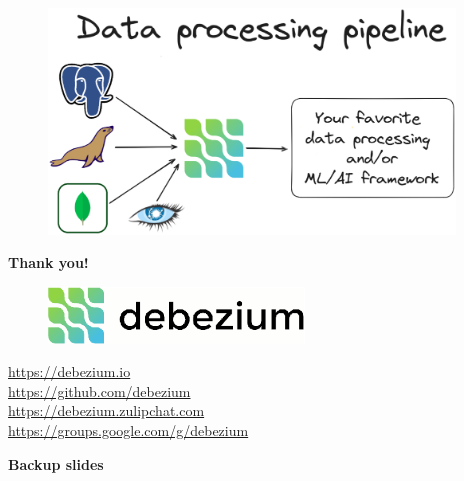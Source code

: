 \documentclass[10pt,utf8]{beamer}
\begin{document}
\begin{frame}
    \begin{figure}
        \centering
        \includegraphics[height=6cm]{./img/dbs_to_ml.eps}
    \end{figure}
\end{frame}

\begin{frame}
    \centering
    \textbf{\Huge{Thank you!}}
    
    \vspace{1cm}
    
    \begin{figure}
        \centering
        \includegraphics[height=1.5cm]{./img/debezium.eps}
    \end{figure}
    
    \vspace{0.5cm}
    
    \centering
    \color{blue}
    \url{https://debezium.io}\\
    \url{https://github.com/debezium}\\
    \url{https://debezium.zulipchat.com}\\
    \url{https://groups.google.com/g/debezium}\\
    \color{black}
\end{frame}



\begin{frame}
    \centering
    \huge{\textbf{Backup slides}}
\end{frame}
\end{document}
